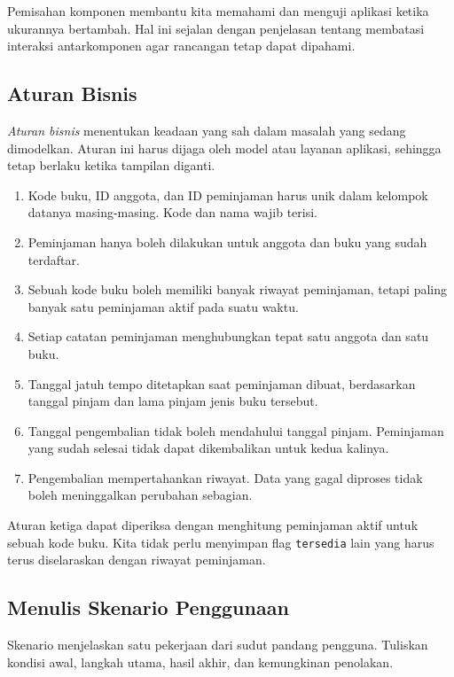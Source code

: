 Pemisahan komponen membantu kita memahami dan menguji aplikasi ketika ukurannya bertambah. Hal ini sejalan dengan penjelasan \cite{wilson2024design} tentang membatasi interaksi antarkomponen agar rancangan tetap dapat dipahami.

\subsection{Aturan Bisnis}

\emph{Aturan bisnis} menentukan keadaan yang sah dalam masalah yang sedang dimodelkan. Aturan ini harus dijaga oleh model atau layanan aplikasi, sehingga tetap berlaku ketika tampilan diganti.

\begin{enumerate}
  \item Kode buku, ID anggota, dan ID peminjaman harus unik dalam kelompok datanya masing-masing. Kode dan nama wajib terisi.
  \item Peminjaman hanya boleh dilakukan untuk anggota dan buku yang sudah terdaftar.
  \item Sebuah kode buku boleh memiliki banyak riwayat peminjaman, tetapi paling banyak satu peminjaman aktif pada suatu waktu.
  \item Setiap catatan peminjaman menghubungkan tepat satu anggota dan satu buku.
  \item Tanggal jatuh tempo ditetapkan saat peminjaman dibuat, berdasarkan tanggal pinjam dan lama pinjam jenis buku tersebut.
  \item Tanggal pengembalian tidak boleh mendahului tanggal pinjam. Peminjaman yang sudah selesai tidak dapat dikembalikan untuk kedua kalinya.
  \item Pengembalian mempertahankan riwayat. Data yang gagal diproses tidak boleh meninggalkan perubahan sebagian.
\end{enumerate}

Aturan ketiga dapat diperiksa dengan menghitung peminjaman aktif untuk sebuah kode buku. Kita tidak perlu menyimpan flag \texttt{tersedia} lain yang harus terus diselaraskan dengan riwayat peminjaman.

\subsection{Menulis Skenario Penggunaan}

Skenario menjelaskan satu pekerjaan dari sudut pandang pengguna. Tuliskan kondisi awal, langkah utama, hasil akhir, dan kemungkinan penolakan.

